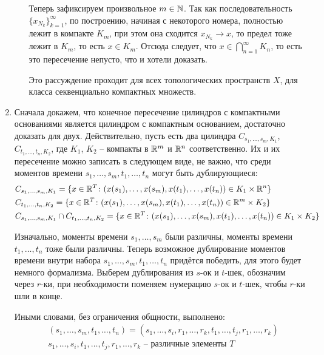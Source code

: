 \begin{solution}
\begin{enumerate}
\begin{itemize}
            Теперь зафиксируем произвольное $m \in \mathbb{N}$. Так как последовательность $\{x_{N_k}\}_{k=1}^\infty$, по построению, начиная с некоторого номера, полностью лежит в компакте $K_m$, при этом она сходится $x_{N_k} \to x$, то предел тоже лежит в $K_m$, то есть $x \in K_m$. Отсюда следует, что $x \in \bigcap_{n=1}^\infty K_n$, то есть это пересечение непусто, что и хотели доказать.

            Это рассуждение проходит для всех топологических пространств $X$, для класса секвенциально компактных множеств.
        \end{itemize}

        \item Сначала докажем, что конечное пересечение цилиндров с компактными основаниями является цилиндром с компактным основанием, достаточно доказать для двух. Действительно, пусть есть два цилиндра $C_{s_1, \dots, s_m, K_1}$, $C_{t_1, \dots, t_n, K_2}$, где $K_1$, $K_2$ -- компакты в $\mathbb{R}^m$ и $\mathbb{R}^n$ соответственно. Их и их пересечение можно записать в следующем виде, не важно, что среди моментов времени $s_1, \dots, s_m, t_1, \dots, t_n$ могут быть дублирующиеся:
        \begin{align*}
            & C_{s_1, \dots, s_m, K_1} = \{x \in \mathbb{R}^T \colon (x(s_1), \dots, x(s_m), x(t_1), \dots, x(t_n)) \in K_1 \times \mathbb{R}^n\}
            \\
            & C_{t_1, \dots, t_n, K_2} = \{x \in \mathbb{R}^T \colon (x(s_1), \dots, x(s_m), x(t_1), \dots, x(t_n)) \in \mathbb{R}^m \times K_2\}
            \\
            & C_{s_1, \dots, s_m, K_1} \cap C_{t_1, \dots, t_n, K_2} = \{x \in \mathbb{R}^T \colon (x(s_1), \dots, x(s_m), x(t_1), \dots, x(t_n)) \in K_1 \times K_2\}
        \end{align*}

        Изначально, моменты времени $s_1, \dots, s_m$ были различны, моменты времени $t_1, \dots, t_n$ тоже были различны. Теперь возможное дублирование моментов времени внутри набора $s_1, \dots, s_m, t_1, \dots, t_n$ придётся победить, для этого будет немного формализма. Выберем дублирования из $s$-ок и $t$-шек, обозначим через $r$-ки, при необходимости поменяем нумерацию $s$-ок и $t$-шек, чтобы $r$-ки шли в конце.
        
        Иными словами, без ограничения общности, выполнено:
        \begin{align*}
            & (s_1, \dots, s_m, t_1, \dots, t_n) = (s_1, \dots, s_i, r_1, \dots, r_k, t_1, \dots, t_j, r_1, \dots, r_k)
            \\
            & s_1, \dots, s_i, t_1, \dots, t_j, r_1, \dots, r_k \text{ -- различные элементы } T
        \end{align*}
        

\end{enumerate}
\end{solution}
